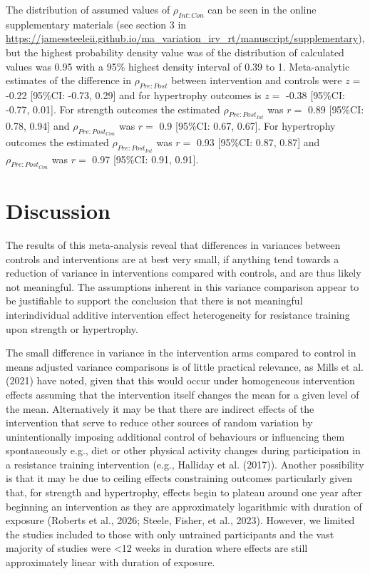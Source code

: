 \documentclass[
]{article}
\begin{document}
The distribution of assumed values of \(\rho_{Int:Con}\) can be seen in
the online supplementary materials (see section 3 in
\url{https://jamessteeleii.github.io/ma_variation_irv_rt/manuscript/supplementary}),
but the highest probability density value was of the distribution of
calculated values was 0.95 with a 95\% highest density interval of 0.39
to 1. Meta-analytic estimates of the difference in \(\rho_{Pre:Post}\)
between intervention and controls were \(z=\) -0.22 {[}95\%CI: -0.73,
0.29{]} and for hypertrophy outcomes is \(z=\) -0.38 {[}95\%CI: -0.77,
0.01{]}. For strength outcomes the estimated \(\rho_{Pre:Post_{Int}}\)
was \(r=\) 0.89 {[}95\%CI: 0.78, 0.94{]} and \(\rho_{Pre:Post_{Con}}\)
was \(r=\) 0.9 {[}95\%CI: 0.67, 0.67{]}. For hypertrophy outcomes the
estimated \(\rho_{Pre:Post_{Int}}\) was \(r=\) 0.93 {[}95\%CI: 0.87,
0.87{]} and \(\rho_{Pre:Post_{Con}}\) was \(r=\) 0.97 {[}95\%CI: 0.91,
0.91{]}.

\section{Discussion}\label{discussion}

The results of this meta-analysis reveal that differences in variances
between controls and interventions are at best very small, if anything
tend towards a reduction of variance in interventions compared with
controls, and are thus likely not meaningful. The assumptions inherent
in this variance comparison appear to be justifiable to support the
conclusion that there is not meaningful interindividual additive
intervention effect heterogeneity for resistance training upon strength
or hypertrophy.

The small difference in variance in the intervention arms compared to
control in means adjusted variance comparisons is of little practical
relevance, as Mills et al. (2021) have noted, given that this would
occur under homogeneous intervention effects assuming that the
intervention itself changes the mean for a given level of the mean.
Alternatively it may be that there are indirect effects of the
intervention that serve to reduce other sources of random variation by
unintentionally imposing additional control of behaviours or influencing
them spontaneously e.g., diet or other physical activity changes during
participation in a resistance training intervention (e.g., Halliday et
al. (2017)). Another possibility is that it may be due to ceiling
effects constraining outcomes particularly given that, for strength and
hypertrophy, effects begin to plateau around one year after beginning an
intervention as they are approximately logarithmic with duration of
exposure (Roberts et al., 2026; Steele, Fisher, et al., 2023). However,
we limited the studies included to those with only untrained
participants and the vast majority of studies were \textless12 weeks in
duration where effects are still approximately linear with duration of
exposure.
\end{document}
